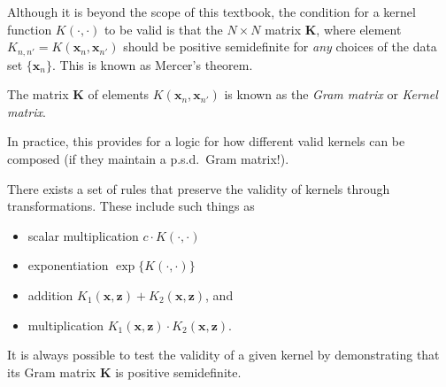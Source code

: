 Although it is beyond the scope of this textbook, the condition for a kernel function $K(\cdot,\cdot)$ to be valid is that the $N\times N$ matrix $\mathbf{K}$, where element $K_{n,n'}= K(\textbf{x}_{n}, \textbf{x}_{n'})$ should be positive semidefinite for {\em any} choices of the data set $\{ \textbf{x}_{n} \}$. This is known as Mercer's theorem.

\begin{warning}
    The matrix ${\mathbf K}$ of elements $K(\textbf{x}_{n}, \textbf{x}_{n'})$ is known as the \textit{Gram matrix} or \textit{Kernel matrix}.
\end{warning}

In practice,  this provides for a logic for how different valid kernels can be composed (if they maintain a p.s.d.~Gram matrix!). 
%

There exists a set of rules that preserve the validity of kernels through transformations. These include such things as
%
\begin{itemize}
\item scalar multiplication $c \cdot K(\cdot,\cdot)$
\item exponentiation $\exp\{K(\cdot,\cdot)\}$
\item addition $K_{1}(\textbf{x}, \textbf{z}) + K_{2}(\textbf{x}, \textbf{z})$, and
\item multiplication $K_{1}(\textbf{x}, \textbf{z}) \cdot K_{2}(\textbf{x}, \textbf{z})$.
\end{itemize}

It is always possible to test the validity of a given kernel by demonstrating that its Gram matrix $\textbf{K}$ is positive semidefinite.
